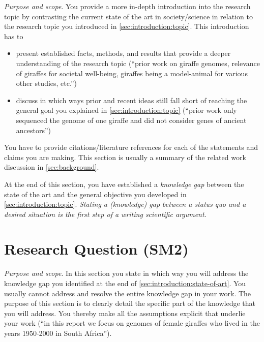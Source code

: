 \documentclass[
  fontsize=10pt,
  numbers=noenddot,
  english,  %
  paper=a5,
  twoside,  %
  DIV=calc,
  headings=small,
  bibliography=totoc,
  listof=totoc,
  draft=false
]{scrbook}
\theoremstyle{break}
\begin{document}
\emph{Purpose and scope}.
You provide a more in-depth introduction into the research topic by contrasting the current state of the art in society/science in relation to the research topic you introduced in \cref{sec:introduction:topic}.
This introduction has to

\begin{itemize}
  \item present established facts, methods, and results that provide a deeper understanding of the research topic (``prior work on giraffe genomes, relevance of giraffes for societal well-being, giraffes being a model-animal for various other studies, etc.'')
  \item discuss in which ways prior and recent ideas still fall short of reaching the general goal you explained in \cref{sec:introduction:topic} (``prior work only sequenced the genome of one giraffe and did not consider genes of ancient ancestors'')
\end{itemize}

You have to provide citations/literature references for each of the statements and claims you are making.
This section is usually a summary of the related work discussion in \cref{sec:background}.

At the end of this section, you have established a \emph{knowledge gap} between the state of the art and the general objective you developed in \cref{sec:introduction:topic}.
\emph{Stating a (knowledge) gap between a status quo and a desired situation is the \emph{first step} of a writing scientific argument.}

\section{Research Question (SM2)}\label{sec:introduction:research-question}

\emph{Purpose and scope}.
In this section you state in which way you will address the knowledge gap you identified at the end of \cref{sec:introduction:state-of-art}.
You usually cannot address and resolve the entire knowledge gap in your work.
The purpose of this section is to clearly detail the specific part of the knowledge that you will address.
You thereby make all the assumptions explicit that underlie your work (``in this report we focus on genomes of female giraffes who lived in the years 1950-2000 in South Africa'').
\end{document}
